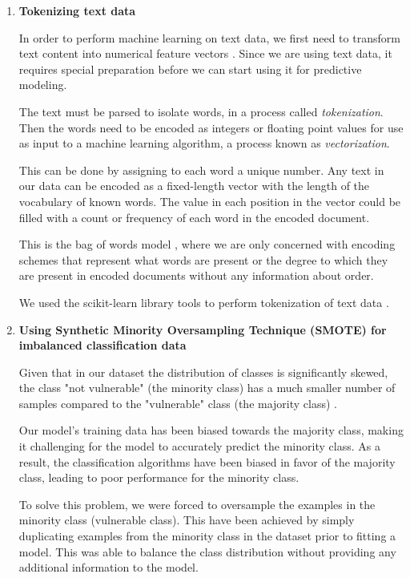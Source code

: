 \begin{enumerate}
\item \textbf{Tokenizing text data}

In order to perform machine learning on text data, we first need to transform text content into numerical feature vectors \cite{Text_Data}. Since we are using text data, it requires special preparation before we can start using it for predictive modeling. 

The text must be parsed to isolate words, in a process called \textit{tokenization}. Then the words need to be encoded as integers or floating point values for use as input to a machine learning algorithm,  a process known as \textit{vectorization}.

This can be done by assigning to each word a unique number. Any text in our data can be encoded as a fixed-length vector with the length of the vocabulary of known words. The value in each position in the vector could be filled with a count or frequency of each word in the encoded document.

This is the bag of words model \cite{Text_Data}, where we are only concerned with encoding schemes that represent what words are present or the degree to which they are present in encoded documents without any information about order.

We used the scikit-learn library tools to perform tokenization of text data \cite{scikit_learn_Text_Data}.

\item \textbf{Using Synthetic Minority Oversampling Technique (SMOTE) for imbalanced classification data}

Given that in our dataset the distribution of classes is significantly skewed, the class "not vulnerable" (the minority class) has a much smaller number of samples compared to the "vulnerable" class (the majority class) \cite{SMOTE_Jason}.

Our model's training data has been biased towards the majority class, making it challenging for the model to accurately predict the minority class. As a result, the classification algorithms have been biased in favor of the majority class, leading to poor performance for the minority class.

To solve this problem, we were forced to oversample the examples in the minority class (vulnerable class). This have been achieved by simply duplicating examples from the minority class in the dataset prior to fitting a model. This was able to balance the class distribution without providing any additional information to the model.


\end{enumerate}

